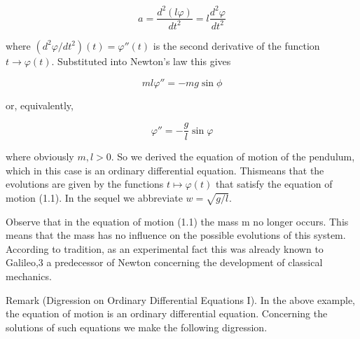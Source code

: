 \documentclass[12pt]{article}
\begin{document}
\[
a = \frac{d^2 (l \varphi)}{dt^2} = l \frac{d^2 \varphi}{dt^2}
\]

where $(d^2 \varphi / dt^2)(t) = \varphi''(t)$ is the second derivative of the function $t \to \varphi(t)$. Substituted into Newton’s law this gives

\[
ml \varphi '' = -mg \sin \phi
\]

or, equivalently,

\[
\varphi '' = -\frac{g}{l} \sin \varphi
\]


where obviously $m, l > 0$. So we derived the equation of motion of the pendulum,
which in this case is an ordinary differential equation. Thismeans that the evolutions
are given by the functions $t \mapsto \varphi(t)$ that satisfy the equation of motion (1.1). In the
sequel we abbreviate $w = \sqrt{g/l}$.

\hfill

Observe that in the equation of motion (1.1) the mass m no longer occurs. This
means that the mass has no influence on the possible evolutions of this system.
According to tradition, as an experimental fact this was already known to Galileo,3
a predecessor of Newton concerning the development of classical mechanics.

\hfill

Remark (Digression on Ordinary Differential Equations I). In the above example,
the equation of motion is an ordinary differential equation. Concerning the solutions
of such equations we make the following digression.
\end{document}
